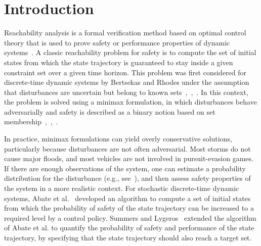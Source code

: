 \documentclass[letterpaper, 10 pt, conference]{ieeeconf}  %
\begin{document}

\section{Introduction}
\label{sec:introduction}
Reachability analysis is a formal verification method based on optimal control theory that is used to prove 
safety or performance properties of dynamic systems~\cite{bansal2017hamilton}.
A classic reachability problem for safety is to compute the set of initial states from which 
the state trajectory is guaranteed to stay inside a given constraint set over a given time horizon.
This problem was first considered for discrete-time dynamic systems by Bertsekas and Rhodes 
under the assumption that disturbances are uncertain but belong to known sets~\cite{bertsekas1971control},~\cite{bertsekas1971minimax},~\cite{bertsekas2005dynamic}.
In this context, the problem is solved using a minimax formulation,
in which disturbances behave adversarially and safety is described as a binary notion based on set membership~\cite{bertsekas1971control},~\cite{bertsekas1971minimax},~\cite[Sec. 3.6.2]{bertsekas2005dynamic}.

In practice, minimax formulations can yield overly conservative solutions, particularly because disturbances are not often adversarial.
Most storms do not cause major floods, and most vehicles are not involved in pursuit-evasion games.
If there are enough observations of the system, one can estimate a probability distribution
for the disturbance (e.g., see~\cite{silverman2018density}), and then assess safety properties of the system in a more realistic context.
For stochastic discrete-time dynamic systems, %
Abate et al.~\cite{abate2008probabilistic} developed an algorithm to compute a set of initial states
from which the probability of safety of the state trajectory can be increased to a required level by a control policy.\footnotemark
{} 
Summers and Lygeros~\cite{summers2010verification} extended the algorithm of Abate et al. to quantify the probability of safety and performance
of the state trajectory, by specifying that the state trajectory should also reach a target set.   
\end{document}
